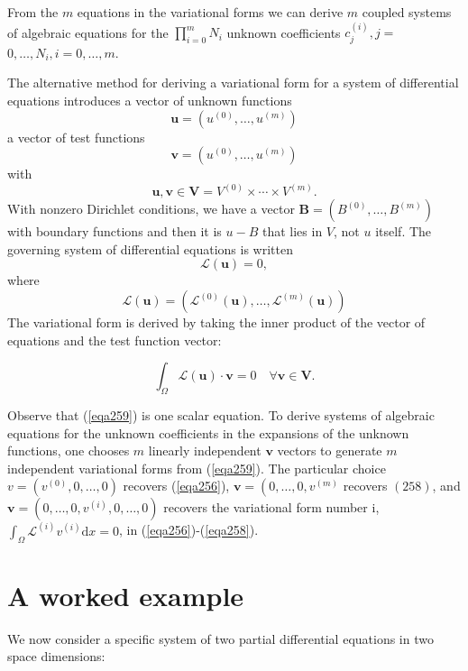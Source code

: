 \documentclass[../main.tex]{subfiles}
\begin{document}
		From the $m$ equations in the variational forms we can derive $m$ coupled systems of algebraic equations for the $\prod_{i=0}^{m} N_{i}$ unknown coefficients $c_{j}^{(i)}, j=$ $0, \ldots, N_{i}, i=0, \ldots, m$.\smallbreak
		
		The alternative method for deriving a variational form for a system of differential equations introduces a vector of unknown functions
		$$
		\boldsymbol{u}=\left(u^{(0)}, \ldots, u^{(m)}\right)
		$$
		a vector of test functions
		$$
		\boldsymbol{v}=\left(u^{(0)}, \ldots, u^{(m)}\right)
		$$
		with
		$$
		\boldsymbol{u}, \boldsymbol{v} \in \boldsymbol{V}=V^{(0)} \times \cdots \times V^{(m)} .
		$$
		With nonzero Dirichlet conditions, we have a vector $\boldsymbol{B}=\left(B^{(0)}, \ldots, B^{(m)}\right)$ with boundary functions and then it is $u-B$ that lies in $V$, not $u$ itself. \smallbreak
		The governing system of differential equations is written
		$$
		\mathcal{L}(\boldsymbol{u})=0,
		$$
		where
		$$
		\mathcal{L}(\boldsymbol{u})=\left(\mathcal{L}^{(0)}(\boldsymbol{u}), \ldots, \mathcal{L}^{(m)}(\boldsymbol{u})\right)
		$$
		The variational form is derived by taking the inner product of the vector of equations and the test function vector:
		
		\begin{equation}
			\label{eqa259}
			\int_{\Omega} \mathcal{L}(\boldsymbol{u}) \cdot \boldsymbol{v}=0 \quad \forall \boldsymbol{v} \in \boldsymbol{V} .
		\end{equation}
	
		Observe that (\ref{eqa259}) is one scalar equation. To derive systems of algebraic equations for the unknown coefficients in the expansions of the unknown functions, one chooses $m$ linearly independent $\boldsymbol{v}$ vectors to generate $m$ independent variational forms from (\ref{eqa259}). The particular choice $v=\left(v^{(0)}, 0, \ldots, 0\right)$ recovers (\ref{eqa256}), $\boldsymbol{v}=\left(0, \ldots, 0, v^{(m)}\right.$ recovers $(258)$, and $\boldsymbol{v}=\left(0, \ldots, 0, v^{(i)}, 0, \ldots, 0\right)$ recovers the variational form number i, $\int_{\Omega} \mathcal{L}^{(i)} v^{(i)} \mathrm{d} x=0$, in (\ref{eqa256})-(\ref{eqa258}).\bigbreak
	\section[A worked example]{A worked example}
		\label{sec:sec_20_2}
		\noindent We now consider a specific system of two partial differential equations in two space dimensions:
		
\end{document}
